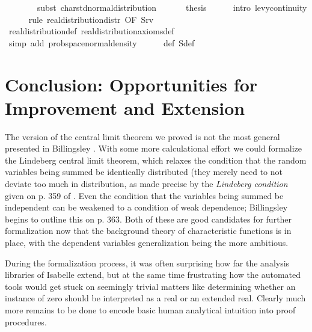 \documentclass{article}
\theoremstyle{definition}
\begin{document}
\begin{isabellebody}
\ \ \ \ \ \ \isamarkupfalse%
\ {\isacharparenleft}subst\ char{\isacharunderscore}std{\isacharunderscore}normal{\isacharunderscore}distribution{\isacharparenright}\isanewline
\ \ \isamarkupfalse%
\isanewline
\ \ \isamarkupfalse%
\ {\isacharquery}thesis\isanewline
\ \ \ \ \isamarkupfalse%
\ {\isacharparenleft}intro\ levy{\isacharunderscore}continuity{\isacharparenright}\isanewline
\ \ \ \ \isamarkupfalse%
\ {\isacharparenleft}rule\ real{\isacharunderscore}distribution{\isacharunderscore}distr\ {\isacharbrackleft}OF\ S{\isacharunderscore}rv{\isacharbrackright}{\isacharparenright}\isanewline
\ \ \ \ \isamarkupfalse%
\ real{\isacharunderscore}distribution{\isacharunderscore}def\ real{\isacharunderscore}distribution{\isacharunderscore}axioms{\isacharunderscore}def\isanewline
\ \ \ \ \isamarkupfalse%
\ {\isacharparenleft}simp\ add{\isacharcolon}\ prob{\isacharunderscore}space{\isacharunderscore}normal{\isacharunderscore}density{\isacharparenright}\isanewline
\ \ \ \ \isamarkupfalse%
\ {\isasymphi}{\isacharunderscore}def\ S{\isacharprime}{\isacharunderscore}def\ \isamarkupfalse%
\ {\isacharminus}\isanewline
{}
\end{isabellebody}

\section{Conclusion: Opportunities for Improvement and Extension}

The version of the central limit theorem we proved is not the most general presented in Billingsley \cite{billingsley}. With some more calculational effort we could formalize the Lindeberg central limit theorem, which relaxes the condition that the random variables being summed be identically distributed (they merely need to not deviate too much in distribution, as made precise by the {\em Lindeberg condition} given on p. 359 of \cite{billingsley}. Even the condition that the variables being summed be independent can be weakened to a condition of weak dependence; Billingsley begins to outline this on p. 363. Both of these are good candidates for further formalization now that the background theory of characteristic functions is in place, with the dependent variables generalization being the more ambitious.

During the formalization process, it was often surprising how far the analysis libraries of Isabelle extend, but at the same time frustrating how the automated tools would get stuck on seemingly trivial matters like determining whether an instance of zero should be interpreted as a real or an extended real. Clearly much more remains to be done to encode basic human analytical intuition into proof procedures.
\end{document}
